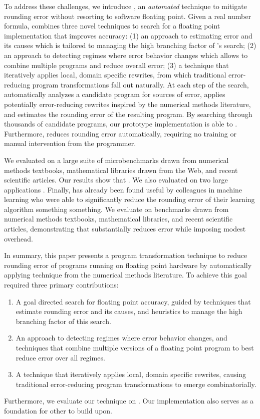 \documentclass[paper.tex]{subfiles}
\begin{document}
To address these challenges, we introduce \casio, an
\textit{automated} technique to mitigate rounding error without
resorting to software floating point.  Given a real number formula,
\casio combines three novel techniques to search for a floating point
implementation that improves accuracy: (1) an approach to estimating
error and its causes which is tailored to managing the high branching
factor of \casio's search; (2) an approach to detecting regimes where
error behavior changes which allows \casio to combine multiple
programs and reduce overall error; (3) a technique that iteratively
applies local, domain specific rewrites, from which traditional
error-reducing program transformations fall out naturally.  At each
step of the search, \casio automatically analyzes a candidate program
for sources of error, applies potentially error-reducing rewrites
inspired by the numerical methods literature, and estimates the
rounding error of the resulting program.  By searching through
thousands of candidate programs, our prototype implementation is able
to .  Furthermore, \casio
reduces rounding error automatically, requiring no training or manual
intervention from the programmer.

We evaluated \casio on a large suite of microbenchmarks drawn from
numerical methods textbooks, mathematical libraries drawn from the
Web, and recent scientific articles.  Our results show that \casio
{}.  We also evaluated \casio on two large applications
.  Finally, \casio has already been found useful by
colleagues in machine learning who were able to significantly reduce
the rounding error of their learning algorithm something something.
We evaluate \casio on benchmarks drawn from numerical methods
textbooks, mathematical libraries, and recent scientific articles,
demonstrating that \casio substantially reduces error while imposing
modest overhead.

In summary, this paper presents a program transformation technique to
reduce rounding error of programs running on floating point hardware
by automatically applying technique from the numerical methods
literature.  To achieve this goal required three primary
contributions:
\begin{enumerate}
\item A goal directed search for floating point accuracy, guided by
  techniques that estimate rounding error and its causes,
  and heuristics to manage the high branching factor of this search.
\item An approach to detecting regimes where error behavior changes,
  and techniques that combine multiple versions of a floating point
  program to best reduce error over all regimes.
\item A technique that iteratively applies local, domain specific rewrites,
  causing traditional error-reducing program transformations
  to emerge combinatorially.
\end{enumerate}
Furthermore, we evaluate our technique on .  Our implementation also serves as a foundation for
other to build upon.
\end{document}

